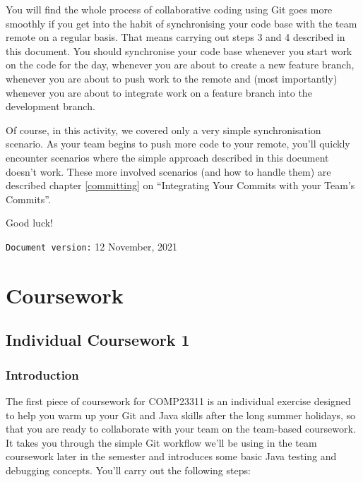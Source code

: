 \documentclass[
]{book}
\begin{document}
You will find the whole process of collaborative coding using Git goes more smoothly if you get into the habit of synchronising your code base with the team remote on a regular basis. That means carrying out steps 3 and 4 described in this document. You should synchronise your code base whenever you start work on the code for the day, whenever you are about to create a new feature branch, whenever you are about to push work to the remote and (most importantly) whenever you are about to integrate work on a feature branch into the development branch.

Of course, in this activity, we covered only a very simple synchronisation scenario. As your team begins to push more code to your remote, you'll quickly encounter scenarios where the simple approach described in this document doesn't work. These more involved scenarios (and how to handle them) are described chapter \ref{committing} on ``Integrating Your Commits with your Team's Commits''.

Good luck!

\texttt{Document\ version:} 12 November, 2021

\hypertarget{part-coursework}{%
\part{Coursework}\label{part-coursework}}

\hypertarget{gitting}{%
\chapter{Individual Coursework 1}\label{gitting}}

\hypertarget{introcw1}{%
\section{Introduction}\label{introcw1}}

The first piece of coursework for COMP23311 is an individual exercise designed to help you warm up your Git and Java skills after the long summer holidays, so that you are ready to collaborate with your team on the team-based coursework. It takes you through the simple Git workflow we'll be using in the team coursework later in the semester and introduces some basic Java testing and debugging concepts. You'll carry out the following steps:
\end{document}
